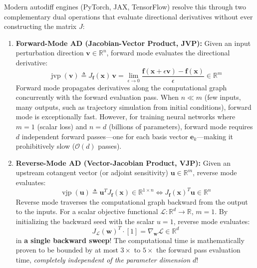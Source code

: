 Modern autodiff engines (PyTorch, JAX, TensorFlow) resolve this through two complementary dual operations that evaluate directional derivatives without ever constructing the matrix $J$:
\begin{enumerate}
    \item \textbf{Forward-Mode AD (Jacobian-Vector Product, JVP):}
    Given an input perturbation direction $\mathbf{v} \in \mathbb{R}^n$, forward mode evaluates the directional derivative:
    \begin{equation}
    \operatorname{jvp}(\mathbf{v}) \triangleq J_{\mathbf{f}}(\mathbf{x})\, \mathbf{v} = \lim_{\epsilon \to 0} \frac{\mathbf{f}(\mathbf{x} + \epsilon \mathbf{v}) - \mathbf{f}(\mathbf{x})}{\epsilon} \in \mathbb{R}^m
    \end{equation}
    Forward mode propagates derivatives along the computational graph concurrently with the forward evaluation pass. When $n \ll m$ (few inputs, many outputs, such as trajectory simulation from initial conditions), forward mode is exceptionally fast. However, for training neural networks where $m = 1$ (scalar loss) and $n = d$ (billions of parameters), forward mode requires $d$ independent forward passes—one for each basis vector $\mathbf{e}_k$—making it prohibitively slow ($\mathcal{O}(d)$ passes).

    \item \textbf{Reverse-Mode AD (Vector-Jacobian Product, VJP):}
    Given an upstream cotangent vector (or adjoint sensitivity) $\mathbf{u} \in \mathbb{R}^m$, reverse mode evaluates:
    \begin{equation}
    \operatorname{vjp}(\mathbf{u}) \triangleq \mathbf{u}^T J_{\mathbf{f}}(\mathbf{x}) \in \mathbb{R}^{1 \times n} \iff J_{\mathbf{f}}(\mathbf{x})^T \mathbf{u} \in \mathbb{R}^n
    \end{equation}
    Reverse mode traverses the computational graph backward from the output to the inputs. For a scalar objective functional $\mathcal{L}: \mathbb{R}^d \to \mathbb{R}$, $m = 1$. By initializing the backward seed with the scalar $u = 1$, reverse mode evaluates:
    \begin{equation}
    J_{\mathcal{L}}(\mathbf{w})^T \cdot [1] = \nabla_{\mathbf{w}} \mathcal{L} \in \mathbb{R}^d
    \end{equation}
    in \textbf{a single backward sweep}! The computational time is mathematically proven to be bounded by at most $3\times$ to $5\times$ the forward pass evaluation time, \emph{completely independent of the parameter dimension $d$}!
\end{enumerate}

